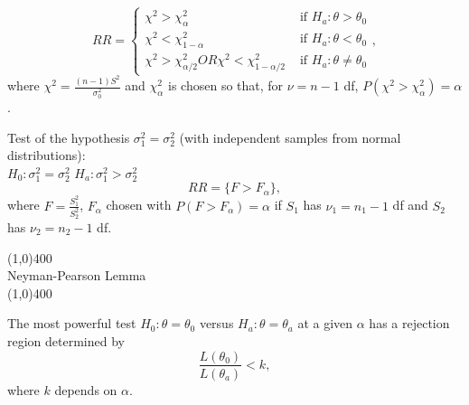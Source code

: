 \documentclass[11pt]{article}
\begin{document}
\[RR = \left\{
\begin{array}{cl}
\chi^2 > \chi^2_\alpha            & \mbox{ if } H_a : \theta > \theta_0    \\
\chi^2 < \chi^2_{1 - \alpha}            & \mbox{ if } H_a : \theta < \theta_0    \\
\chi^2 > \chi^2_{\alpha/2} OR \chi^2 < \chi^2_{1 - \alpha/2} & \mbox{ if } H_a : \theta \neq \theta_0
\end{array}
    \right.,\]
where $\chi^2 = \frac{(n - 1)S^2}{\sigma_0^2}$ and $\chi_\alpha^2$ is chosen so
that, for $\nu = n - 1$ df, $P(\chi^2 > \chi_\alpha^2) = \alpha$.

Test of the hypothesis $\sigma^2_1 = \sigma^2_2$ (with independent samples from
normal distributions):\\
$H_0 : \sigma^2_1 = \sigma^2_2$ \quad $H_a : \sigma^2_1 > \sigma^2_2$
\[RR = \{F > F_\alpha\},\]
where $F = \frac{S_1^2}{S_2^2}$, $F_\alpha$ chosen with $P(F > F_\alpha) =
\alpha$ if $S_1$ has $\nu_1 = n_1 - 1$ df and $S_2$ has $\nu_2 = n_2 - 1$ df.
\begin{center}
\line(1,0){400}\\
{\large Neyman-Pearson Lemma}\\
\vspace{-0.1in}
\line(1,0){400}
\end{center}
The most powerful test $H_0 : \theta = \theta_0$ versus
$H_a : \theta = \theta_a$ at a given $\alpha$ has a rejection region determined
by \[\frac{L(\theta_0)}{L(\theta_a)} < k,\] where $k$ depends on $\alpha$.
\end{document}
